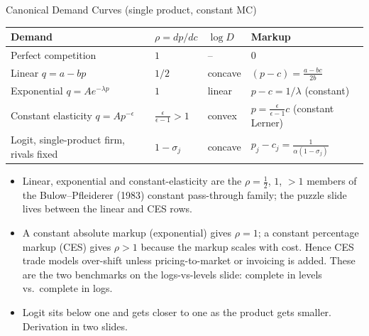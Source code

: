 \documentclass[aspectratio=169,10pt]{beamer}
\begin{document}
\begin{frame}{Canonical Demand Curves (single product, constant MC)}
\small
\begin{center}
\renewcommand{\arraystretch}{1.15}
\begin{tabular}{llll}
\toprule
Demand & $\rho = dp/dc$ & $\log D$ & Markup \\
\midrule
Perfect competition & $1$ & -- & $0$ \\
Linear $q = a - b p$ & $1/2$ & concave & $(p - c) = \frac{a - bc}{2b}$ \\
Exponential $q = A e^{-\lambda p}$ & $1$ & linear & $p - c = 1/\lambda$ (constant) \\
Constant elasticity $q = A p^{-\epsilon}$ & $\frac{\epsilon}{\epsilon - 1} > 1$ & convex & $p = \frac{\epsilon}{\epsilon-1} c$ (constant Lerner) \\
Logit, single-product firm, rivals fixed & $1 - \sigma_j$ & concave & $p_j - c_j = \frac{1}{\alpha (1-\sigma_j)}$ \\
\bottomrule
\end{tabular}
\end{center}
\begin{itemize}
\item Linear, exponential and constant-elasticity are the $\rho = \frac{1}{2}$, $1$, $>1$ members of the Bulow--Pfleiderer (1983) constant pass-through family; the puzzle slide lives between the linear and CES rows.
\item A \alert{constant absolute markup} (exponential) gives $\rho = 1$; a \alert{constant percentage markup} (CES) gives $\rho > 1$ because the markup scales with cost. Hence CES trade models over-shift unless pricing-to-market or invoicing is added. These are the two benchmarks on the logs-vs-levels slide: complete in levels vs.\ complete in logs.
\item Logit sits below one and gets \alert{closer} to one as the product gets smaller. Derivation in two slides.
\end{itemize}
\end{frame}
\end{document}
